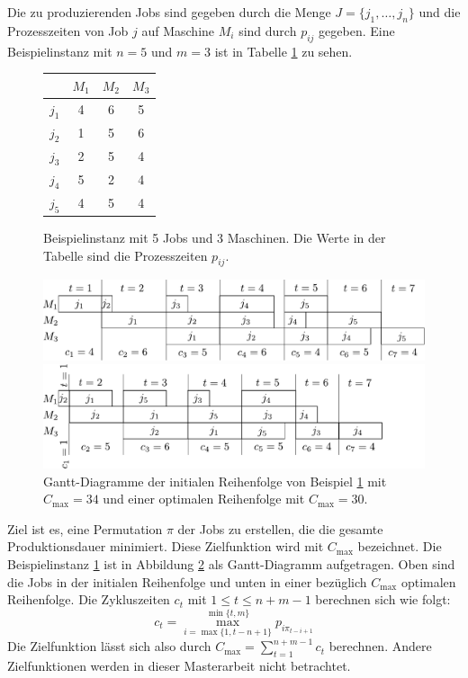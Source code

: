 \documentclass{scrreprt}
\begin{document}
Die zu produzierenden Jobs sind gegeben durch die Menge $J=\{j_1,\ldots,j_n\}$ 
und die Prozesszeiten von Job $j$ auf Maschine $M_i$ sind durch $p_{ij}$ gegeben.
Eine Beispielinstanz mit $n=5$ und $m=3$ ist in Tabelle \ref{abb:Bsp} zu sehen.
\begin{figure}
    \begin{center}
        \begin{tabular}{c|ccc}
            & $M_1$ & $M_2$ & $M_3$ \\ \hline
            $j_1$ & 4 & 6 & 5 \\
            $j_2$ & 1 & 5 & 6 \\
            $j_3$ & 2 & 5 & 4 \\
            $j_4$ & 5 & 2 & 4 \\
            $j_5$ & 4 & 5 & 4
        \end{tabular}
    \end{center}
    \caption{
        \label{abb:Bsp}
        Beispielinstanz mit 5 Jobs und 3 Maschinen. Die Werte in der Tabelle sind die Prozesszeiten $p_{ij}$.
    }
\end{figure}
\begin{figure}
    \begin{center}
        \includegraphics[width=.8\textwidth]{graphics/bspinit.pdf}
    \end{center}
    \begin{center}
        \includegraphics[width=.8\textwidth]{graphics/bspopt.pdf}
    \end{center}
    \caption{
        \label{abb:gantt}
        Gantt-Diagramme der initialen Reihenfolge von Beispiel \ref{abb:Bsp} mit $C_{\max}=34$
        und einer optimalen Reihenfolge mit $C_{\max}=30$.
    }
\end{figure}
Ziel ist es, eine Permutation $\pi$ der Jobs zu erstellen, die die gesamte Produktionsdauer minimiert.
Diese Zielfunktion wird mit $C_{\max}$ bezeichnet.
Die Beispielinstanz \ref{abb:Bsp} ist in Abbildung \ref{abb:gantt} als Gantt-Diagramm aufgetragen.
Oben sind die Jobs in der initialen Reihenfolge und unten in einer bezüglich $C_{\max}$ optimalen Reihenfolge.
Die Zykluszeiten $c_t$ mit $1\leq t\leq n+m-1$ berechnen sich wie folgt:
\[ c_t = \max_{i=\max\{1,t-n+1\}}^{\min\{t,m\}} p_{i\pi_{t-i+1}} \]
Die Zielfunktion lässt sich also durch $C_{\max} = \sum_{t=1}^{n+m-1} c_t$ berechnen.
Andere Zielfunktionen werden in dieser Masterarbeit nicht betrachtet.
\end{document}
